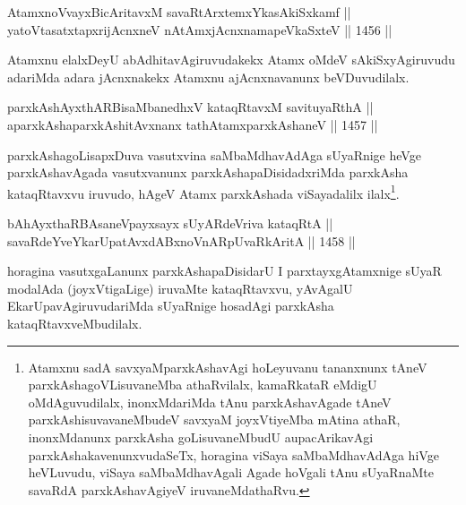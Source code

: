 
\begin{shl}
AtamxnoV\s vayxBicAritavxM savaRtArx\s \s temxYkasAkiSxkamf || \\
yatoV\s tasatxtapxrijAcnxneV nA\s \s tAmx\s jAcnxnamapeVkaSxteV ||  1456 ||
\end{shl}

\begin{artha}
Atamxnu elalxDeyU abAdhitavAgiruvudakekx Atamx oMdeV sAkiSxyAgiruvudu adariMda adara jAcnxnakekx Atamxnu ajAcnxnavanunx beVDuvudilalx.
\end{artha}


\begin{shl}
parxkAshAyxthARBisaMbanedhxV kataqRtavxM savituyaRthA ||  \\
aparxkAshaparxkAshitAvxnanx tathA\s \s tamxparxkAshaneV ||  1457 ||  
\end{shl}

\begin{artha}
parxkAshagoLisapxDuva vasutxvina saMbaMdhavAdAga sUyaRnige heVge parxkAshavAgada vasutxvanunx parxkAshapaDisidadxriMda parxkAsha kataqRtavxvu iruvudo, hAgeV Atamx parxkAshada viSayadalilx ilalx\footnote{Atamxnu sadA savxyaMparxkAshavAgi hoLeyuvanu tananxnunx tAneV parxkAshagoVLisuvaneMba athaRvilalx, kamaRkataR eMdigU oMdAguvudilalx, inonxMdariMda tAnu parxkAshavAgade tAneV parxkAshisuvavaneMbudeV savxyaM joyxVtiyeMba mAtina athaR, inonxMdanunx parxkAsha goLisuvaneMbudU aupacArikavAgi parxkAshakavenunxvudaSeTx, horagina viSaya saMbaMdhavAdAga hiVge heVLuvudu, viSaya saMbaMdhavAgali Agade hoVgali tAnu sUyaRnaMte savaRdA parxkAshavAgiyeV iruvaneMdathaRvu.}.
\end{artha}

\begin{shl}
\footnotemark[2]bAhAyxthaRBAsaneV\s payxsayx sUyARdeVriva kataqRtA || \\
savaRdeYveYkarUpatAvxdABxnoVnARpUvaRkAritA ||  1458 ||  
\end{shl}

\begin{artha}
horagina vasutxgaLanunx parxkAshapaDisidarU I parxtayxgAtamxnige sUyaR modalAda (joyxVtigaLige) iruvaMte kataqRtavxvu, yAvAgalU EkarUpavAgiruvudariMda sUyaRnige hosadAgi parxkAsha kataqRtavxveMbudilalx.
\end{artha}

